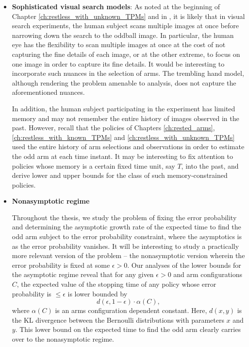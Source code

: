 \begin{itemize}
\item \textbf{Sophisticated visual search models}: As noted at the beginning of Chapter \ref{ch:restless_with_unknown_TPMs} and in \cite{naghshvar2013two}, it is likely that in visual search experiments, the human subject scans multiple images at once before narrowing down the search to the oddball image. In particular, the human eye has the flexibility to scan multiple images at once at the cost of not capturing the fine details of each image, or at the other extreme, to focus on one image in order to capture its fine details. It would be interesting to incorporate such nuances in the selection of arms. The trembling hand model, although rendering the problem amenable to analysis, does not capture the aforementioned nuances.

In addition, the human subject participating in the experiment has limited memory and may not remember the entire history of images observed in the past. However, recall that the policies of Chapters \ref{ch:rested_arms}, \ref{ch:restless_with_known_TPMs} and \ref{ch:restless_with_unknown_TPMs} used the entire history of arm selections and observations in order to estimate the odd arm at each time instant. It may be interesting to fix attention to policies whose memory is a certain fixed time unit, say $T$, into the past, and derive lower and upper bounds for the class of such memory-constrained policies.

\item  {\color{black} \textbf{Nonasymptotic regime}
 
 Throughout the thesis, we study the problem of fixing the error probability and determining the asymptotic growth rate of the expected time to find the odd arm subject to the error probability constraint, where the asymptotics is as the error probability vanishes. It will be interesting to study a practically more relevant version of the problem -- the nonasymptotic version wherein the error probability is fixed at some $\epsilon>0$. Our analyses of the lower bounds for the asymptotic regime reveal that for any given $\epsilon>0$ and arm configurations $C$, the expected value of the stopping time of any policy whose error probability is $\leq \epsilon$ is lower bounded by $$d(\epsilon, 1-\epsilon)\cdot \alpha(C),$$ where $\alpha(C)$ is an arms configuration dependent constant. Here, $d(x, y)$ is the KL divergence between the Bernoulli distributions with parameters $x$ and $y$. This lower bound on the expected time to find the odd arm clearly carries over to the nonasymptotic regime. 

}
\end{itemize}
